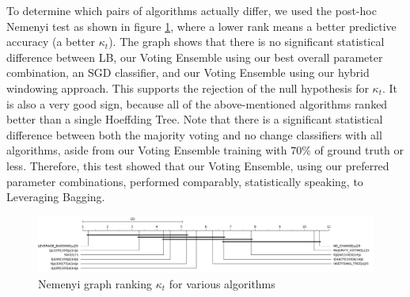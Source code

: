\documentclass[runningheads]{llncs}
\begin{document}


To determine which pairs of algorithms actually differ, we used the post-hoc Nemenyi test as shown in figure \ref{fig:sota_compare_all_kappa_nemenyi}, where a lower rank means a better predictive accuracy (a better $\kappa_t$).
The graph shows that there is no significant statistical difference between LB, our Voting Ensemble using our best overall parameter combination, an SGD classifier, and our Voting Ensemble using our hybrid windowing approach. This supports the rejection of the null hypothesis for $\kappa_t$. It is also a very good sign, because all of the above-mentioned algorithms ranked better than a single Hoeffding Tree.
Note that there is a significant statistical difference between both the majority voting and no change classifiers with all algorithms, aside from our Voting Ensemble training with $70\%$ of ground truth or less.
Therefore, this test showed that our Voting Ensemble, using our preferred parameter combinations, performed comparably, statistically speaking, to Leveraging Bagging.

\begin{figure}
  \includegraphics[width=\linewidth]{./images/chapter5/sota_compare_all_kappa_nemenyi}
\caption{\label{fig:sota_compare_all_kappa_nemenyi}Nemenyi graph ranking $\kappa_t$ for various algorithms}
\end{figure}

\end{document}
